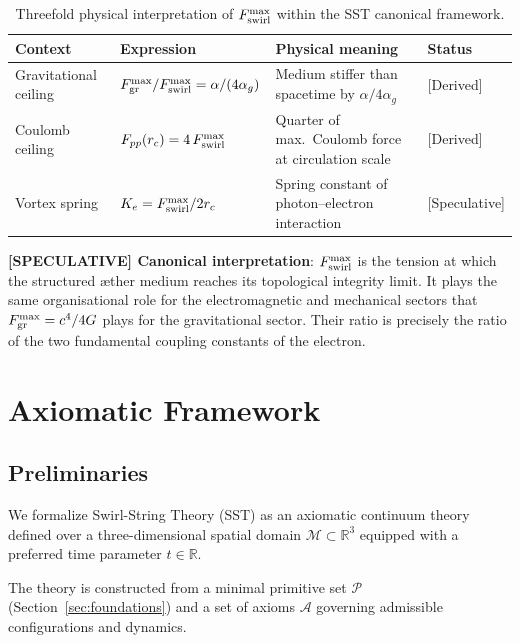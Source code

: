 \documentclass[11pt]{article}
\theoremstyle{definition}
\theoremstyle{plain}
\theoremstyle{remark}
\newcommand{\rc}{{r_c}}
\begin{document}
        \begin{table}[h]
        \centering
        \caption{Threefold physical interpretation of $F_{\rm swirl}^{\max}$ within the SST canonical framework.}
        \label{tab:Fmax_triple}
        \begin{tabular}{p{3.2cm}p{5.0cm}p{4.8cm}l}
        \hline
        \textbf{Context} & \textbf{Expression} & \textbf{Physical meaning} & \textbf{Status} \\
        \hline
        Gravitational ceiling &
          $F_{\rm gr}^{\max}/F_{\rm swirl}^{\max} = \alpha/(4\alpha_g)$ &
          Medium stiffer than spacetime by $\alpha/4\alpha_g$ &
          {[Derived]} \\[6pt]
        Coulomb ceiling &
          $F_{pp}(\rc) = 4\,F_{\rm swirl}^{\max}$ &
          Quarter of max.\ Coulomb force at circulation scale &
          {[Derived]} \\[6pt]
        Vortex spring &
          $K_e = F_{\rm swirl}^{\max}/2\rc$ &
          Spring constant of photon--electron interaction &
          {[Speculative]} \\
        \hline
        \end{tabular}
        \end{table}

        \textbf{[SPECULATIVE] Canonical interpretation}: $F_{\rm swirl}^{\max}$ is the tension at which the structured \ae ther medium reaches its topological integrity limit. It plays the same organisational role for the electromagnetic and mechanical sectors that $F_{\rm gr}^{\max} = c^4/4G$ plays for the gravitational sector. Their ratio is precisely the ratio of the two fundamental coupling constants of the electron.

\section{Axiomatic Framework}
    \label{sec:axioms}
    
    \subsection{Preliminaries}
        
        We formalize Swirl-String Theory (SST) as an axiomatic continuum theory defined over a three-dimensional spatial domain $\mathcal{M} \subset \mathbb{R}^3$ equipped with a preferred time parameter $t \in \mathbb{R}$.
        
        The theory is constructed from a minimal primitive set $\mathcal{P}$ (Section~\ref{sec:foundations}) and a set of axioms $\mathcal{A}$ governing admissible configurations and dynamics.
    
\end{document}
